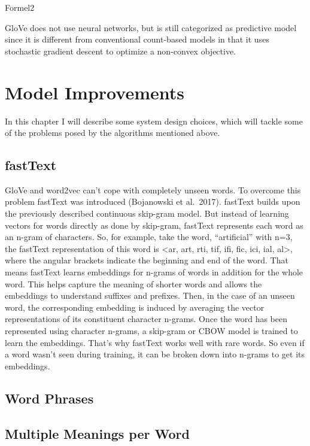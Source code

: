 \documentclass[]{krantz}
\begin{document}
Formel2

GloVe does not use neural networks, but is still categorized as predictive model since it is different from conventional count-based models in that it uses stochastic gradient descent to optimize a non-convex objective.

\hypertarget{model-improvements}{%
\section{Model Improvements}\label{model-improvements}}

In this chapter I will describe some system design choices, which will tackle some of the problems posed by the algorithms mentioned above.

\hypertarget{fasttext}{%
\subsection{fastText}\label{fasttext}}

GloVe and word2vec can't cope with completely unseen words. To overcome this problem fastText was introduced (Bojanowski et al.~2017). fastText builds upon the previously described continuous skip-gram model. But instead of learning vectors for words directly as done by skip-gram, fastText represents each word as an n-gram of characters. So, for example, take the word, ``artificial'' with n=3, the fastText representation of this word is \textless{}ar, art, rti, tif, ifi, fic, ici, ial, al\textgreater{}, where the angular brackets indicate the beginning and end of the word. That means fastText learns embeddings for n-grams of words in addition for the whole word. This helps capture the meaning of shorter words and allows the embeddings to understand suffixes and prefixes. Then, in the case of an unseen word, the corresponding embedding is induced by averaging the vector representations of its constituent character n-grams. Once the word has been represented using character n-grams, a skip-gram or CBOW model is trained to learn the embeddings. That's why fastText works well with rare words. So even if a word wasn't seen during training, it can be broken down into n-grams to get its embeddings.

\hypertarget{word-phrases}{%
\subsection{Word Phrases}\label{word-phrases}}

\hypertarget{multiple-meanings-per-word}{%
\subsection{Multiple Meanings per Word}\label{multiple-meanings-per-word}}
\end{document}
